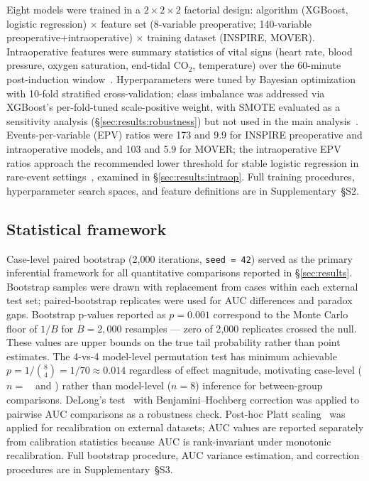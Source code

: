 Eight models were trained in a $2 \times 2 \times 2$ factorial design: algorithm (XGBoost, logistic regression) $\times$ feature set (8-variable preoperative; 140-variable preoperative+intraoperative) $\times$ training dataset (INSPIRE, MOVER). Intraoperative features were summary statistics of vital signs (heart rate, blood pressure, oxygen saturation, end-tidal CO$_2$, temperature) over the 60-minute post-induction window~\cite{Fritz2019}. Hyperparameters were tuned by Bayesian optimization with 10-fold stratified cross-validation; class imbalance was addressed via XGBoost's per-fold-tuned scale-positive weight, with SMOTE evaluated as a sensitivity analysis (§\ref{sec:results:robustness}) but not used in the main analysis~\cite{Carriero2025}. Events-per-variable (EPV) ratios were 173 and 9.9 for INSPIRE preoperative and intraoperative models, and 103 and 5.9 for MOVER; the intraoperative EPV ratios approach the recommended lower threshold for stable logistic regression in rare-event settings~\cite{Riley2019b}, examined in §\ref{sec:results:intraop}. Full training procedures, hyperparameter search spaces, and feature definitions are in Supplementary~§S2.

\subsection{Statistical framework}
\label{methods:statframework}

Case-level paired bootstrap (2,000 iterations, \texttt{seed = 42}) served as the primary inferential framework for all quantitative comparisons reported in §\ref{sec:results}. Bootstrap samples were drawn with replacement from cases within each external test set; paired-bootstrap replicates were used for AUC differences and paradox gaps. Bootstrap p-values reported as $p = 0.001$ correspond to the Monte Carlo floor of $1/B$ for $B = 2{,}000$ resamples --- zero of 2{,}000 replicates crossed the null. These values are upper bounds on the true tail probability rather than point estimates. The 4-vs-4 model-level permutation test has minimum achievable $p = 1/\binom{8}{4} = 1/70 \approx 0.014$ regardless of effect magnitude, motivating case-level ($n = $~\pnTableOneNInspire\ and \pnTableOneNMover) rather than model-level ($n = 8$) inference for between-group comparisons. DeLong's test~\cite{DeLong1988} with Benjamini--Hochberg correction was applied to pairwise AUC comparisons as a robustness check. Post-hoc Platt scaling~\cite{Platt1999} was applied for recalibration on external datasets; AUC values are reported separately from calibration statistics because AUC is rank-invariant under monotonic recalibration. Full bootstrap procedure, AUC variance estimation, and correction procedures are in Supplementary~§S3.

